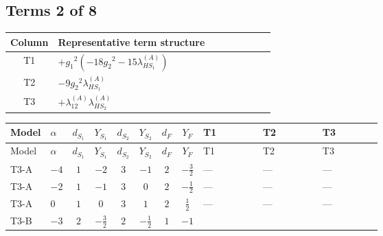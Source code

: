 \documentclass[8pt]{article}
\begin{document}
\begin{landscape}
\subsection*{Terms 2 of 8}
\begin{center}
\begin{tabular}{@{}c >{\raggedright\arraybackslash}p{0.82\linewidth}@{}}
\toprule
Column & Representative term structure \\
\midrule
T1 & \(\displaystyle +{g_1}^2 \left(-18 {g_2}^2-15 {\lambda_{HS_1}^{(A)}}\right)\) \\
\midrule
T2 & \(\displaystyle -9 {g_2}^2 {\lambda_{HS_1}^{(A)}}\) \\
\midrule
T3 & \(\displaystyle +{\lambda_{12}^{(A)}} {\lambda_{HS_2}^{(A)}}\) \\
\midrule
\bottomrule
\end{tabular}
\end{center}
\smallskip
\tiny
\begin{longtable}{@{}llcccccc >{\raggedright\arraybackslash}p{0.21\linewidth} >{\raggedright\arraybackslash}p{0.21\linewidth} >{\raggedright\arraybackslash}p{0.21\linewidth}@{}}
\toprule
Model & $\alpha$ & $d_{S_1}$ & $Y_{S_1}$ & $d_{S_2}$ & $Y_{S_2}$ & $d_F$ & $Y_F$ & T1 & T2 & T3 \\
\midrule
\endfirsthead
\toprule
Model & $\alpha$ & $d_{S_1}$ & $Y_{S_1}$ & $d_{S_2}$ & $Y_{S_2}$ & $d_F$ & $Y_F$ & T1 & T2 & T3 \\
\midrule
\endhead
T3-A & $-4$ & $1$ & $-2$ & $3$ & $-1$ & $2$ & $-\frac{3}{2}$ & --- & --- & --- \\
\midrule
T3-A & $-2$ & $1$ & $-1$ & $3$ & $0$ & $2$ & $-\frac{1}{2}$ & --- & --- & --- \\
\midrule
T3-A & $0$ & $1$ & $0$ & $3$ & $1$ & $2$ & $\frac{1}{2}$ & --- & --- & --- \\
\midrule
T3-B & $-3$ & $2$ & $-\frac{3}{2}$ & $2$ & $-\frac{1}{2}$ & $1$ & $-1$ & \scriptsize\adjustbox{max width=\linewidth}{$\begin{gathered} +{g_1}^2 \left(-18 {g_2}^2-15 {\lambda_{HS_1}^{(A)}}\right)\end{gathered}$} & \scriptsize\adjustbox{max width=\linewidth}{$\begin{gathered} -9 {g_2}^2 {\lambda_{HS_1}^{(A)}}\end{gathered}$} & \scriptsize\adjustbox{max width=\linewidth}{$\begin{gathered} +{\lambda_{12}^{(A)}} {\lambda_{HS_2}^{(A)}}\end{gathered}$} \\

\end{longtable}
\end{landscape}
\end{document}
